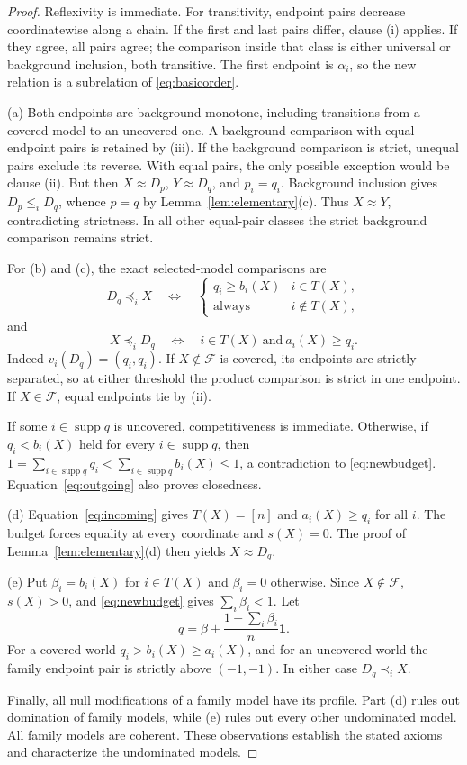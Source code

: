 \documentclass[11pt]{article}
\theoremstyle{remark}
\newcommand{\supp}{\operatorname{supp}}
\newcommand{\one}{\mathbf 1}
\newcommand{\F}{\mathcal F}
\begin{document}
\begin{proof}
Reflexivity is immediate. For transitivity, endpoint pairs decrease
coordinatewise along a chain. If the first and last pairs differ, clause (i)
applies. If they agree, all pairs agree; the comparison inside that class is
either universal or background inclusion, both transitive. The first endpoint
is $\alpha_i$, so the new relation is a subrelation of \eqref{eq:basicorder}.

(a) Both endpoints are background-monotone, including transitions from a
covered model to an uncovered one. A background comparison with equal endpoint
pairs is retained by (iii). If the background comparison is strict, unequal
pairs exclude its reverse. With equal pairs, the only possible exception would
be clause (ii). But then $X\approx D_p$, $Y\approx D_q$, and $p_i=q_i$.
Background inclusion gives $D_p\le_iD_q$, whence $p=q$ by
Lemma~\ref{lem:elementary}(c). Thus $X\approx Y$, contradicting strictness.
In all other equal-pair classes the strict background comparison remains strict.

For (b) and (c), the exact selected-model comparisons are
\[
 D_q\preceq_iX\quad\Longleftrightarrow\quad
 \begin{cases}q_i\ge b_i(X)&i\in T(X),\\\text{always}&i\notin T(X),\end{cases}
 \tag{4}\label{eq:outgoing}
\]
and
\[
 X\preceq_iD_q\quad\Longleftrightarrow\quad
 i\in T(X)\ \text{and}\ a_i(X)\ge q_i.
 \tag{5}\label{eq:incoming}
\]
Indeed $v_i(D_q)=(q_i,q_i)$. If $X\notin\F$ is covered, its endpoints are
strictly separated, so at either threshold the product comparison is strict
in one endpoint. If $X\in\F$, equal endpoints tie by (ii).

If some $i\in\supp q$ is uncovered, competitiveness is immediate. Otherwise,
if $q_i<b_i(X)$ held for every $i\in\supp q$, then
$1=\sum_{i\in\supp q}q_i<\sum_{i\in\supp q}b_i(X)\le1$, a contradiction
to \eqref{eq:newbudget}. Equation~\eqref{eq:outgoing} also proves closedness.

(d) Equation~\eqref{eq:incoming} gives $T(X)=[n]$ and $a_i(X)\ge q_i$
for all $i$. The budget forces equality at every coordinate and $s(X)=0$.
The proof of Lemma~\ref{lem:elementary}(d) then yields $X\approx D_q$.

(e) Put $\beta_i=b_i(X)$ for $i\in T(X)$ and $\beta_i=0$ otherwise.
Since $X\notin\F$, $s(X)>0$, and \eqref{eq:newbudget} gives
$\sum_i\beta_i<1$. Let
\[
 q=\beta+\frac{1-\sum_i\beta_i}{n}\one.
\]
For a covered world $q_i>b_i(X)\ge a_i(X)$, and for an uncovered world the
family endpoint pair is strictly above $(-1,-1)$. In either case
$D_q\prec_iX$.

Finally, all null modifications of a family model have its profile. Part (d)
rules out domination of family models, while (e) rules out every other
undominated model. All family models are coherent. These observations establish
the stated axioms and characterize the undominated models.
\end{proof}
\end{document}
